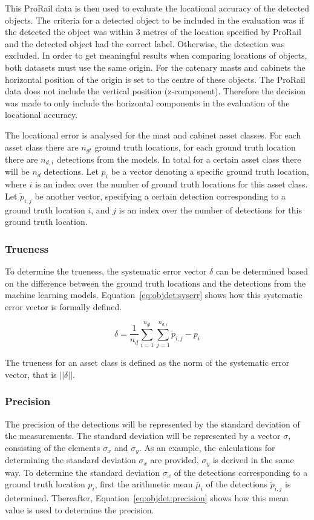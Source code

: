 This ProRail data is then used to evaluate the locational accuracy of the detected objects. The criteria for a detected object to be included in the evaluation was if the detected the object was within 3 metres of the location specified by ProRail and the detected object had the correct label. Otherwise, the detection was excluded. In order to get meaningful results when comparing locations of objects, both datasets must use the same origin. For the catenary masts and cabinets the horizontal position of the origin is set to the centre of these objects. The ProRail data does not include the vertical position (z-component). Therefore the decision was made to only include the horizontal components in the evaluation of the locational accuracy.

The locational error is analysed for the mast and cabinet asset classes. For each asset class there are $n_{gt}$ ground truth locations, for each ground truth location there are $n_{d,i}$ detections from the models. In total for a certain asset class there will be $n_d$ detections. Let $p_i$ be a vector denoting a specific ground truth location, where $i$ is an index over the number of ground truth locations for this asset class. Let $\tilde{p}_{i,j}$ be another vector, specifying a certain detection corresponding to a ground truth location $i$, and $j$ is an index over the number of detections for this ground truth location.

\subsubsection{Trueness} %
To determine the trueness, the systematic error vector $\delta$ can be determined based on the difference between the ground truth locations and the detections from the machine learning models. Equation~\ref{eq:objdet:syserr} shows how this systematic error vector is formally defined.

\begin{equation}
   \delta = \frac{1}{n_d} \sum_{i=1}^{n_{gt}} \sum_{j=1}^{n_{d,i}} \tilde{p}_{i,j} - p_i
   \label{eq:objdet:syserr}
\end{equation}

The trueness for an asset class is defined as the norm of the systematic error vector, that is $||\delta||$.

\subsubsection{Precision} %
The precision of the detections will be represented by the standard deviation of the measurements. The standard deviation will be represented by a vector $\sigma$, consisting of the elements $\sigma_x$ and $\sigma_y$. As an example, the calculations for determining the standard deviation $\sigma_x$ are provided, $\sigma_y$ is derived in the same way. To determine the standard deviation $\sigma_x$ of the detections corresponding to a ground truth location $p_i$, first the arithmetic mean $\tilde{\mu_i}$ of the detections $\tilde{p}_{i,j}$ is determined. Thereafter, Equation~\ref{eq:objdet:precision} shows how this mean value is used to determine the precision. 

